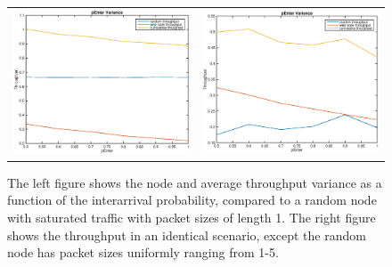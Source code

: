 \begin{figure}
\begin{center}
\begin{tabular}{cc}

\includegraphics[scale=0.35]{../../src/fig-simulation_random_web-penter-1_0_1_0_1_1_5.eps} & \includegraphics[scale=0.35]{../../src/fig-simulation_random_web-penter-1_0_5_0_1_1_5.eps} \\
\end{tabular}
\caption{The left figure shows the node and average throughput variance as a function of the interarrival probability, compared to a random node with saturated traffic with packet sizes of length 1. The right figure shows the throughput in an identical scenario, except the random node has packet sizes uniformly ranging from 1-5.}
\label{fig:randomstuff3}
\end{center}
\end{figure}